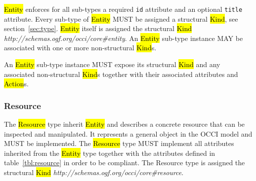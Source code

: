 \documentclass[10pt,a4paper,british]{article}
\begin{document}

\hl{Entity} enforces for all sub-types a required \texttt{id} attribute and an
optional \texttt{title} attribute.
%
Every sub-type of \hl{Entity} MUST be assigned a structural \hl{Kind}, see
section~\ref{sec:type}. \hl{Entity} itself is assigned the structural \hl{Kind}
\textit{http://schemas.ogf.org/occi/core\#entity}.
%
An \hl{Entity} sub-type instance MAY be associated with one or more non-structural
\hl{Kind}s.

An \hl{Entity} sub-type instance MUST expose its structural \hl{Kind} and any
associated non-structural \hl{Kind}s together with their associated attributes
and \hl{Action}s.

\subsubsection{Resource}
\label{sec:resource}
The \hl{Resource} type inherit \hl{Entity} and describes a concrete resource that
can be inspected and manipulated. It represents a general object in the OCCI
model and MUST be implemented.
%
The \hl{Resource} type MUST implement all attributes inherited from the
\hl{Entity} type together with the attributes defined in table~\ref{tbl:resource}
in order to be compliant.
%
The Resource type is assigned the structural \hl{Kind}
\textit{http://schemas.ogf.org/occi/core\#resource}.

\end{document}
